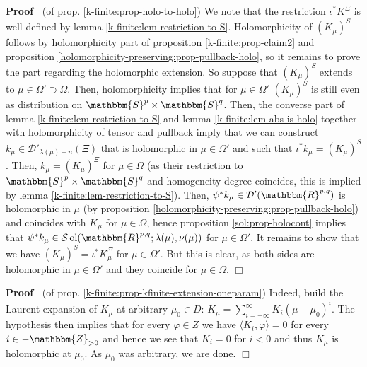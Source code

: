 \documentclass{article}
\newcommand{\tmop}[1]{\ensuremath{\operatorname{#1}}}
\newenvironment{proof}{\noindent\textbf{Proof\ }}{\hspace*{\fill}$\Box$\medskip}
\numberwithin{definition}{section}
\numberwithin{lemma}{section}
\numberwithin{proposition}{section}
{\theorembodyfont{\rmfamily}\newtheorem{remark}{Remark}
\numberwithin{remark}{section}
}
\begin{document}
\begin{proof}
  (of prop. \ref{k-finite:prop-holo-to-holo}) We note that the restriction
  $\iota^{\ast} K^{\Xi}$ is well-defined by lemma
  \ref{k-finite:lem-restriction-to-S}. Holomorphicity of $( K_{\mu})^S$
  follows by holomorphicity part of proposition \ref{k-finite:prop-claim2} and
  proposition \ref{holomorphicity-preserving:prop-pullback-holo}, so it
  remains to prove the part regarding the holomorphic extension. So suppose
  that $( K_{\mu})^S$ extends to $\mu \in \Omega' \supset \Omega$. Then,
  holomorphicity implies that for $\mu \in \Omega'$ $( K_{\mu})^S$ is still
  even as distribution on $\mathbbm{S}^p \times \mathbbm{S}^q$. Then, the
  converse part of lemma \ref{k-finite:lem-restriction-to-S} and lemma
  \ref{k-finite:lem-abs-is-holo} together with holomorphicity of tensor and
  pullback imply that we can construct $k_{\mu} \in \mathcal{D}'_{\lambda (
  \mu) - n} ( \Xi)$ that is holomorphic in $\mu \in \Omega'$ and such that
  $\iota^{\ast} k_{\mu} = ( K_{\mu})^S$. Then, $k_{\mu} = ( K_{\mu})^{\Xi}$
  for $\mu \in \Omega$ (as their restriction to $\mathbbm{S}^p \times
  \mathbbm{S}^q$ and homogeneity degree coincides, this is implied by lemma
  \ref{k-finite:lem-restriction-to-S}). Then, $\psi^{\ast} k_{\mu} \in
  \mathcal{D}' ( \mathbbm{R}^{p, q})$ is holomorphic in $\mu$ (by proposition
  \ref{holomorphicity-preserving:prop-pullback-holo}) and coincides with
  $K_{\mu}$ for $\mu \in \Omega$, hence proposition \ref{sol:prop-holocont}
  implies that $\psi^{\ast} k_{\mu} \in \mathcal{S} \tmop{ol} (
  \mathbbm{R}^{p, q} ; \lambda ( \mu), \nu ( \mu))$ for $\mu \in \Omega'$. It
  remains to show that we have $( K_{\mu})^S = \iota^{\ast} K_{\mu}^{\Xi}$ for
  $\mu \in \Omega'$. But this is clear, as both sides are holomorphic in $\mu
  \in \Omega'$ and they coincide for $\mu \in \Omega$.
\end{proof}

\begin{proof}
  (of prop. \ref{k-finite:prop-kfinite-extension-oneparam}) Indeed, build the
  Laurent expansion of $K_{\mu}$ at arbitrary $\mu_0 \in D$: $K_{\mu} =
  \sum_{i = - \infty}^{\infty} K_i ( \mu - \mu_0)^i$. The hypothesis then
  implies that for every $\varphi \in Z$ we have $\langle K_i, \varphi \rangle
  = 0$ for every $i \in -\mathbbm{Z}_{> 0}$ and hence we see that $K_i = 0$
  for $i < 0$ and thus $K_{\mu}$ is holomorphic at $\mu_0$. As $\mu_0$ was
  arbitrary, we are done.
\end{proof}
\end{document}
